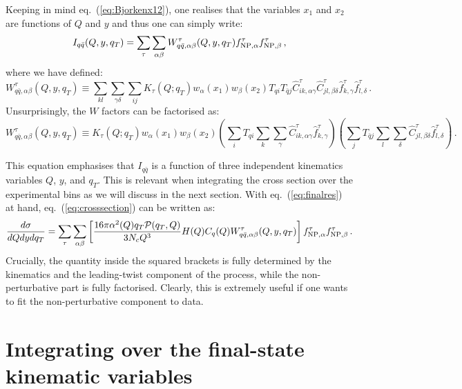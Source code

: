 \documentclass[10pt,a4paper]{article}
\begin{document}
Keeping in mind eq.~(\ref{eq:Bjorkenx12}), one realises that the
variables $x_1$ and $x_2$ are functions of $Q$ and $y$ and thus one
can simply write:
\begin{equation}\label{eq:finalres}
  I_{q\bar{q}}(Q, y, q_T) =
  \sum_\tau \sum_{\alpha\beta} W_{q\bar{q},\alpha\beta}^{\tau}(Q,y,q_T) f_{{\rm NP},\alpha}^\tau f_{{\rm NP},\beta}^\tau\,,
\end{equation}
where we have defined:
\begin{equation}
W_{q\bar{q},\alpha\beta}^{\tau}(Q,y,q_T)\equiv \sum_{kl} \sum_{\gamma\delta}\sum_{ij}K_\tau(Q;q_T)w_\alpha(x_1)w_\beta(x_2) T_{qi}T_{\bar{q}j}\hat{C}_{ik,\alpha\gamma}^\tau
  \hat{C}_{jl,\beta\delta}^\tau \hat{f}_{k,\gamma}^\tau \hat{f}_{l,\delta}^\tau\,.
\end{equation}
Unsurprisingly, the $W$ factors can be factorised as:
\begin{equation}
  W_{q\bar{q},\alpha\beta}^{\tau}(Q,y,q_T)\equiv
  K_\tau(Q;q_T)w_\alpha(x_1)w_\beta(x_2) \left(\sum_{i} T_{qi}\sum_{k} \sum_{\gamma}\hat{C}_{ik,\alpha\gamma}^\tau
    \hat{f}_{k,\gamma}^\tau\right)
  \left(\sum_{j} T_{\bar{q}j}\sum_{l} \sum_{\delta}
    \hat{C}_{jl,\beta\delta}^\tau \hat{f}_{l,\delta}^\tau\right)\,.
\end{equation}

This equation emphasises that $I_{q\bar{q}}$ is a function of three
independent kinematics variables $Q$, $y$, and $q_T$. This is relevant
when integrating the cross section over the experimental bins as we
will discuss in the next section. With eq.~(\ref{eq:finalres}) at
hand, eq.~(\ref{eq:crosssection}) can be written as:
\begin{equation}
\frac{d\sigma}{dQ dy dq_T} =\sum_\tau \sum_{\alpha\beta}\left[
  \frac{16\pi\alpha^2(Q)q_T\mathcal{P}(q_T,Q)}{3N_c Q^3} H(Q) 
  C_q(Q) W_{q\bar{q},\alpha\beta}^{\tau}(Q,y,q_T) \right]f_{{\rm NP},\alpha}^\tau f_{{\rm NP},\beta}^\tau\,.
\end{equation}
Crucially, the quantity inside the squared brackets is fully
determined by the kinematics and the leading-twist component of the
process, while the non-perturbative part is fully factorised. Clearly,
this is extremely useful if one wants to fit the non-perturbative
component to data.

\section{Integrating over the final-state kinematic variables}
\end{document}
